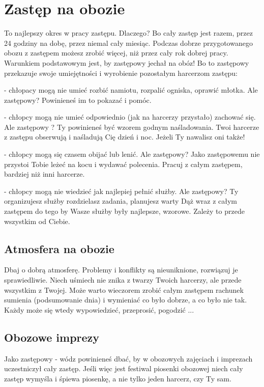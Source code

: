 \section{Zastęp na obozie}
To najlepszy okres w pracy zastępu. Dlaczego? Bo cały zastęp jest razem, przez  24 godziny na dobę, przez niemal cały miesiąc. Podczas dobrze przygotowanego obozu z zastępem możesz zrobić więcej, niż przez cały rok dobrej pracy.
	Warunkiem podstawowym jest, by zastępowy jechał na obóz! Bo to zastępowy przekazuje swoje umiejętności i wyrobienie pozostałym harcerzom zastępu:

- chłopacy mogą nie umieć rozbić namiotu, rozpalić ogniska, oprawić młotka. Ale zastępowy? Powinieneś im to  pokazać i pomóc.

- chłopcy mogą nie umieć odpowiednio (jak na harcerzy przystało) zachować się. Ale zastępowy ? Ty powinieneś być wzorem godnym naśladowania. Twoi harcerze z zastępu obserwują i naśladują Cię dzień i noc. Jeżeli Ty nawalisz oni także!

- chłopcy mogą się czasem obijać lub lenić. Ale zastępowy? Jako zastępowemu nie przystoi Tobie leżeć na kocu i wydawać  polecenia. Pracuj z całym zastępem, bardziej niż inni harcerze.

- chłopcy mogą nie wiedzieć jak najlepiej pełnić służby. Ale zastępowy? Ty organizujesz  służby rozdzielasz zadania, planujesz warty Dąż  wraz  z całym  zastępem do tego by Wasze służby były najlepsze, wzorowe. Zależy to przede  wszystkim  od  Ciebie.

\subsection{Atmosfera  na  obozie}
	Dbaj o dobrą atmosferę. Problemy i konflikty są nieuniknione, rozwiązuj  je  sprawiedliwie. Niech uśmiech nie znika z  twarzy Twoich harcerzy, ale przede wszystkim z Twojej. Może warto wieczorem zrobić całym zastępem rachunek  sumienia (podsumowanie dnia) i wymieniać co było dobrze, a co było nie tak. Każdy może się wtedy  wypowiedzieć, przeprosić, pogodzić ...

\subsection{Obozowe imprezy}
	Jako  zastępowy - wódz  powinieneś  dbać, by  w  obozowych  zajęciach  i  imprezach  uczestniczył  cały  zastęp. Jeśli więc jest festiwal piosenki obozowej niech cały zastęp wymyśla i śpiewa piosenkę, a nie tylko jeden harcerz, czy Ty sam.

